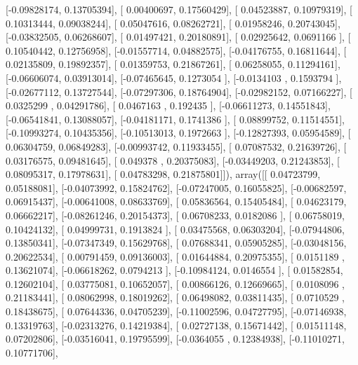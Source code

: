 \documentclass{article}
\begin{document}
       [-0.09828174,  0.13705394],
       [ 0.00400697,  0.17560429],
       [ 0.04523887,  0.10979319],
       [ 0.10313444,  0.09038244],
       [ 0.05047616,  0.08262721],
       [ 0.01958246,  0.20743045],
       [-0.03832505,  0.06268607],
       [ 0.01497421,  0.20180891],
       [ 0.02925642,  0.0691166 ],
       [ 0.10540442,  0.12756958],
       [-0.01557714,  0.04882575],
       [-0.04176755,  0.16811644],
       [ 0.02135809,  0.19892357],
       [ 0.01359753,  0.21867261],
       [ 0.06258055,  0.11294161],
       [-0.06606074,  0.03913014],
       [-0.07465645,  0.1273054 ],
       [-0.0134103 ,  0.1593794 ],
       [-0.02677112,  0.13727544],
       [-0.07297306,  0.18764904],
       [-0.02982152,  0.07166227],
       [ 0.0325299 ,  0.04291786],
       [ 0.0467163 ,  0.192435  ],
       [-0.06611273,  0.14551843],
       [-0.06541841,  0.13088057],
       [-0.04181171,  0.1741386 ],
       [ 0.08899752,  0.11514551],
       [-0.10993274,  0.10435356],
       [-0.10513013,  0.1972663 ],
       [-0.12827393,  0.05954589],
       [ 0.06304759,  0.06849283],
       [-0.00993742,  0.11933455],
       [ 0.07087532,  0.21639726],
       [ 0.03176575,  0.09481645],
       [ 0.049378  ,  0.20375083],
       [-0.03449203,  0.21243853],
       [ 0.08095317,  0.17978631],
       [ 0.04783298,  0.21875801]]), array([[ 0.04723799,  0.05188081],
       [-0.04073992,  0.15824762],
       [-0.07247005,  0.16055825],
       [-0.00682597,  0.06915437],
       [-0.00641008,  0.08633769],
       [ 0.05836564,  0.15405484],
       [ 0.04623179,  0.06662217],
       [-0.08261246,  0.20154373],
       [ 0.06708233,  0.0182086 ],
       [ 0.06758019,  0.10424132],
       [ 0.04999731,  0.1913824 ],
       [ 0.03475568,  0.06303204],
       [-0.07944806,  0.13850341],
       [-0.07347349,  0.15629768],
       [ 0.07688341,  0.05905285],
       [-0.03048156,  0.20622534],
       [ 0.00791459,  0.09136003],
       [ 0.01644884,  0.20975355],
       [ 0.0151189 ,  0.13621074],
       [-0.06618262,  0.0794213 ],
       [-0.10984124,  0.0146554 ],
       [ 0.01582854,  0.12602104],
       [ 0.03775081,  0.10652057],
       [ 0.00866126,  0.12669665],
       [ 0.0108096 ,  0.21183441],
       [ 0.08062998,  0.18019262],
       [ 0.06498082,  0.03811435],
       [ 0.0710529 ,  0.18438675],
       [ 0.07644336,  0.04705239],
       [-0.11002596,  0.04727795],
       [-0.07146938,  0.13319763],
       [-0.02313276,  0.14219384],
       [ 0.02727138,  0.15671442],
       [ 0.01511148,  0.07202806],
       [-0.03516041,  0.19795599],
       [-0.0364055 ,  0.12384938],
       [-0.11010271,  0.10771706],
\end{document}
